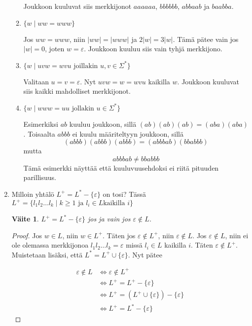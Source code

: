 \documentclass[a4paper,11pt,draft]{article}
\newtheorem*{claim}{Väite}
\begin{document}
\begin{enumerate}
\begin{enumerate}
    Joukkoon kuuluvat siis merkkijonot $aaaaaa$, $bbbbbb$, $abbaab$
    ja $baabba$.

  \item
    $\{w \mid ww = www\}$

    Jos $ww = www$, niin $|ww| = |www|$ ja $2|w| = 3|w|$.
    Tämä pätee vain jos $|w| = 0$, joten $w = \varepsilon$. Joukkoon
    kuuluu siis vain tyhjä merkkijono.

  \item
    $\{w \mid uvw = wvu \text{ joillakin } u,v \in \Sigma^*\}$

    Valitaan $u = v = \varepsilon$. Nyt $uvw = w = wvu$ kaikilla
    $w$. Joukkoon kuuluvat siis kaikki mahdolliset merkkijonot.

  \item
    $\{w \mid www = uu \text{ jollakin } u \in \Sigma^*\}$

    Esimerkiksi $ab$ kuuluu joukkoon, sillä $(ab)(ab)(ab) =
    (aba)(aba)$. Toisaalta $abbb$ ei kuulu määriteltyyn joukkoon,
    sillä
    \begin{equation*}
    (abbb)(abbb)(abbb) = (abbbab)(bbabbb)
    \end{equation*}
    mutta
    \begin{equation*}
      abbbab \neq bbabbb
    \end{equation*}
    Tämä esimerkki näyttää että kuuluvuusehdoksi ei riitä pituuden
    parillisuus.
  \end{enumerate}

\item
  Milloin yhtälö $L^+ = L^* - \{\varepsilon\}$ on tosi? Tässä $L^+ =
  \{l_1l_2 \ldots l_k \mid k \ge 1 \text{ ja } l_i \in L \text{
    kaikilla } i\}$

  \begin{claim}
    $L^+ = L^* - \{\varepsilon\}$ jos ja vain jos $\varepsilon \notin L$.
  \end{claim}

  \begin{proof}
    Jos $w \in L$, niin $w \in L^+$. Täten jos $\varepsilon \notin
    L^+$, niin $\varepsilon \notin L$. Jos $\varepsilon \notin L$,
    niin ei ole olemassa merkkijonoa $l_1l_2 \ldots l_k =
    \varepsilon$ missä $l_i \in L$ kaikilla $i$. Täten $\varepsilon
    \notin L^+$. Muistetaan lisäksi, että $L^* = L^+ \cup
    \{\varepsilon\}$. Nyt pätee

    \begin{align*}
      \varepsilon \notin L &\Leftrightarrow \varepsilon \notin L^+ \\
      &\Leftrightarrow L^+ = L^+ - \{\varepsilon\} \\
      &\Leftrightarrow L^+ = (L^+ \cup \{\varepsilon\}) -
      \{\varepsilon\} \\
      &\Leftrightarrow L^+ = L^* - \{\varepsilon\}
    \end{align*}


\end{proof}
\end{enumerate}
\end{document}
